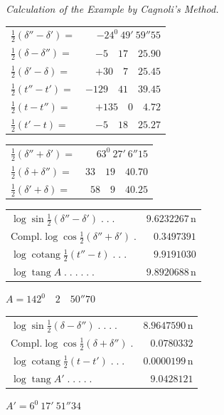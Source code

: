 \clearpage\begin{center}\emph{Calculation of the Example by Cagnoli’s Method.}\end{center}
\begin{center}\small
\begin{minipage}[t]{.49\textwidth}\centering
\begin{tabular}[t]{@{}lr@{}}
$\tfrac12(\delta''-\delta')=$&$-24^0\ 49'\ 59''55$\\
$\tfrac12(\delta-\delta'')=$&$-5\quad17\quad25.90$\\
$\tfrac12(\delta'-\delta)=$&$+30\quad7\quad25.45$\\[10pt]
$\tfrac12(t''-t')=$&$-129\quad41\quad39.45$\\
$\tfrac12(t-t'')=$&$+135\quad0\quad4.72$\\
$\tfrac12(t'-t)=$&$-5\quad18\quad25.27$
\end{tabular}
\end{minipage}\hfill
\begin{minipage}[t]{.49\textwidth}\centering
\begin{tabular}[t]{@{}lr@{}}
$\tfrac12(\delta''+\delta')=$&$63^0\ 27'\ 6''15$\\
$\tfrac12(\delta+\delta'')=$&$33\quad19\quad40.70$\\
$\tfrac12(\delta'+\delta)=$&$58\quad9\quad40.25$
\end{tabular}
\end{minipage}
\par\medskip
\begin{tabular}[b]{@{}lr@{}}
$\log\sin\tfrac12(\delta''-\delta')\;.\;.\;.$&$9.6232267\,\mathrm n$\\
$\mathrm{Compl.}\log\cos\tfrac12(\delta''+\delta')\;.$&$0.3497391$\\
$\log\operatorname{cotang}\tfrac12(t''-t)\;.\;.\;.$&$9.9191030$\\\hline
$\log\operatorname{tang}A\;.\;.\;.\;.\;.\;.$&$9.8920688\,\mathrm n$
\end{tabular}
\qquad $A=142^0\quad2\quad50''70$
\par\medskip
\begin{tabular}[b]{@{}lr@{}}
$\log\sin\tfrac12(\delta-\delta'')\;.\;.\;.\;.$&$8.9647590\,\mathrm n$\\
$\mathrm{Compl.}\log\cos\tfrac12(\delta+\delta'')\;.$&$0.0780332$\\
$\log\operatorname{cotang}\tfrac12(t-t')\;.\;.\;.$&$0.0000199\,\mathrm n$\\\hline
$\log\operatorname{tang}A'\;.\;.\;.\;.\;.$&$9.0428121$
\end{tabular}
\qquad $A'=6^0\ 17'\ 51''34$
\end{center}
